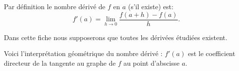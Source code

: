 \documentclass[11pt,class=report,crop=false]{standalone}
\begin{document}






\begin{cours}[Dérivée]
Par définition le nombre dérivé de $f$ en $a$ (s'il existe) est:
$$f'(a) = \lim_{h\to0} \frac{f(a+h)-f(a)}{h}.$$

Dans cette fiche nous supposerons que toutes les dérivées étudiées existent.

Voici l'interprétation géométrique du nombre dérivé : $f'(a)$ est le coefficient directeur de la tangente
au graphe de $f$ au point d'abscisse $a$.


\end{cours}
\end{document}
